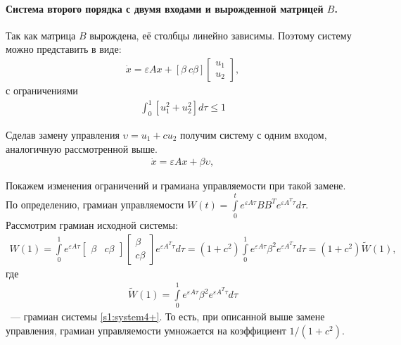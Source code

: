 \documentclass[../main.tex]{subfiles}
\begin{document}
\paragraph{Система второго порядка с двумя входами и вырожденной матрицей $B$.}
Так как матрица $  B $ вырождена, её столбцы линейно зависимы.
Поэтому систему можно представить в виде:
\begin{gather}\label{s1:system4}
     \dot{x} = \varepsilon A x + \left[ \beta \ c\beta \right]  {\left[ {\begin{array}{*{20}{c}}
                 {{u_1}}\\
                 {{u_2}}
         \end{array}} \right]}, 
\end{gather}
с ограничениями 
\begin{gather}\label{s1:contrainsts1}
    \int_{0}^{1} \left[ u_1^2 + u_2^2 \right] d \tau \leqslant 1
\end{gather}
 
Сделав   замену  управления $ \upsilon = u_1 + c u_2 $ получим систему с одним входом, аналогичную рассмотренной выше.
\begin{gather}\label{s1:system4+}
    \dot{x} = \varepsilon A x + \beta \upsilon, 
\end{gather}
 
Покажем изменения ограничений и грамиана управляемости при такой замене.
По определению, грамиан управляемости $ W(t) = \int \limits_0 ^ t e^{\varepsilon A\tau} B B^T e^{\varepsilon A^T\tau} d\tau  $.
Рассмотрим грамиан исходной системы: 
\begin{gather*}
    W(1) = \int \limits_0 ^ 1 e^{\varepsilon A\tau}  \left[ \begin{array}{cc}
         \beta & c \beta
     \end{array} \right] \left[ \begin{array}{c}
         \beta
         \\ c \beta 
     \end{array} \right] e^{\varepsilon A^T\tau} d\tau = (1 + c^2)  \int \limits_0 ^ 1 e^{\varepsilon A\tau} \beta^2 e^{\varepsilon A^T\tau} d\tau = (1 + c^2) \tilde{W}(1),
\end{gather*}
где 
\begin{gather*}
    \tilde{W}(1) = \int \limits_0 ^ 1 e^{\varepsilon A\tau} \beta^2 e^{\varepsilon A^T\tau} d\tau 
\end{gather*}
~--- грамиан системы \eqref{s1:system4+}.
То есть, при описанной выше замене управления, грамиан управляемости умножается на коэффициент $ 1/(1 + c^2)$.
 
\end{document}
